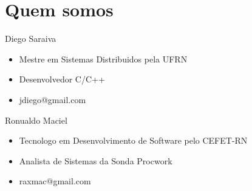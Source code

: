 \section{Quem somos}

\begin{frame}
	\begin{block}{Diego Saraiva}
		\begin{itemize}
		  \item Mestre em Sistemas Distribuidos pela UFRN
		  \item Desenvolvedor C/C++
		  \item jdiego@gmail.com
		\end{itemize}
	\end{block}
	
	\begin{block}{Ronualdo Maciel}
		\begin{itemize}
			\item Tecnologo em Desenvolvimento de Software pelo CEFET-RN
			\item Analista de Sistemas da Sonda Procwork
			\item raxmac@gmail.com
		\end{itemize}
	\end{block}
\end{frame}